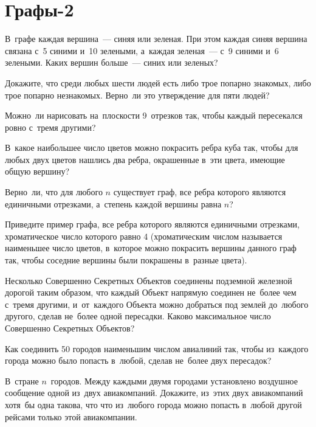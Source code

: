 
\section*{Графы-2}


\begin{problems}

\item
В~графе каждая вершина~--- синяя или зеленая.
При этом каждая синяя вершина связана с~5 синими и~10 зелеными, а~каждая
зеленая~--- с~9 синими и~6 зелеными.
Каких вершин больше~--- синих или зеленых?

\item
Докажите, что среди любых шести людей есть либо трое попарно знакомых, либо
трое попарно незнакомых.
Верно~ли это утверждение для пяти людей?

\item
Можно~ли нарисовать на~плоскости 9~отрезков так, чтобы каждый пересекался ровно
с~тремя другими?

\item
В~какое наибольшее число цветов можно покрасить ребра куба так, чтобы для любых
двух цветов нашлись два ребра, окрашенные в~эти цвета, имеющие общую вершину?

\item
Верно~ли, что для любого $n$ существует граф, все ребра которого являются
единичными отрезками, а~степень каждой вершины равна $n$?

\item
Приведите пример графа, все ребра которого являются единичными отрезками,
хроматическое число которого равно 4 (хроматическим числом называется
наименьшее число цветов, в~которое можно покрасить вершины данного граф так,
чтобы соседние вершины были покрашены в~разные цвета).

\item
Несколько Совершенно Секретных Объектов соединены подземной железной дорогой
таким образом,
что каждый Объект напрямую соединен не~более чем с~тремя другими, и~от~каждого
Объекта можно добраться под землей до~любого другого, сделав не~более одной
пересадки.
Каково максимальное число Совершенно Секретных Объектов?

\item
Как соединить 50 городов наименьшим числом авиалиний так, чтобы из~каждого
города можно было попасть в~любой,
сделав не~более двух пересадок?

\item
В~стране $n$~городов.
Между каждыми двумя городами установлено воздушное сообщение одной из~двух
авиакомпаний.
Докажите, из~этих двух авиакомпаний хотя~бы одна такова, что что из~любого
города можно попасть в~любой другой рейсами только этой авиакомпании.

\end{problems}

